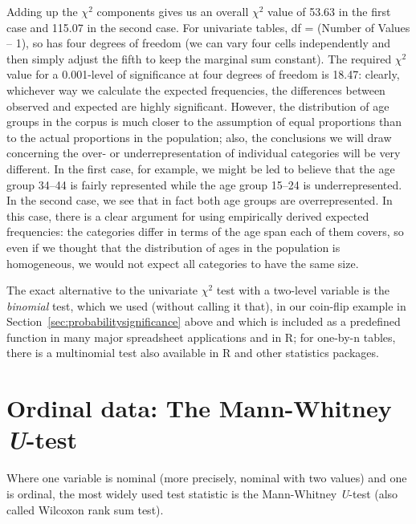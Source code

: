 Adding up the $\chi^2$  components gives us an overall $\chi^2$ value of 53.63 in the first case and 115.07 in the second case. For univariate tables, df = (Number of Values -- 1), so  has four degrees of freedom (we can vary four cells independently and then simply adjust the fifth to keep the marginal sum constant). The required $\chi^2$  value for a 0.001\hyp{}level of significance  at four degrees of freedom is 18.47: clearly, whichever way we calculate the expected  frequencies, the differences between observed and expected are highly significant. However, the distribution  of age  groups in the corpus is much closer to the assumption of equal proportions than to the actual proportions in the population; also, the conclusions we will draw concerning the over- or underrepresentation  of individual categories  will be very different. In the first case, for example, we might be led to believe that the age  group 34--44 is fairly represented while the age  group 15--24 is underrepresented. In the second case, we see that in fact both age  groups are overrepresented. In this case, there is a clear argument for using empirically derived expected  frequencies: the categories  differ in terms of the age  span each of them covers, so even if we thought that the distribution of ages in the population is homogeneous, we would not expect all categories to have the same size.

The exact alternative to the univariate $\chi^2$  test with a two\hyp{}level variable is the \textit{binomial}  test, which we used (without calling it that), in our coin\hyp{}flip example in Section~\ref{sec:probabilitysignificance} above and which is included as a predefined function in many major spreadsheet applications and in R; for one\hyp{}by\hyp{}n tables, there is a multinomial test also available in R and other statistics packages.

\section{Ordinal data: The Mann\hyp{}Whitney \textit{U}\hyp{}test}
\label{sec:mannwhitneytest}

Where one variable is nominal  (more precisely, nominal with two values) and one is ordinal,  the most widely used test statistic is the Mann\hyp{}Whitney  \textit{U}-test (also called Wilcoxon rank sum test).

